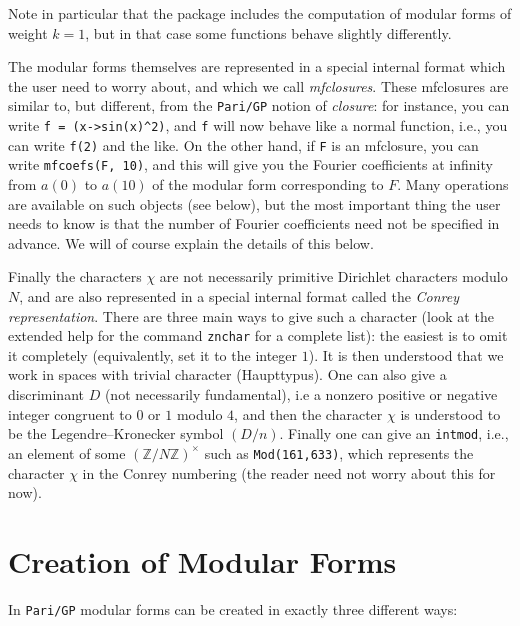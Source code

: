 \documentclass[11pt]{article}
\newcommand{\Z}{{\mathbb Z}}
\def\kbd#1{{\tt #1}}
\begin{document}
Note in particular that the package includes the computation of modular
forms of weight $k=1$, but in that case some functions behave slightly
differently.

\medskip

The modular forms themselves are represented in a special internal format
which the user need to worry about, and which we call \emph{mfclosures}.
These mfclosures are similar to, but different, from the \kbd{Pari/GP} notion
of \emph{closure}: for instance, you can write \kbd{f = (x->sin(x)\^{}2)},
and \kbd{f} will now behave like a normal function, i.e., you can write
\kbd{f(2)} and the like. On the other hand, if \kbd{F} is an mfclosure,
you can write \kbd{mfcoefs(F, 10)}, and this will give you the Fourier
coefficients at infinity from $a(0)$ to $a(10)$ of the modular form
corresponding to $F$. Many operations are available on such objects
(see below), but the most important thing the user needs to know is that
the number of Fourier coefficients need not be specified in advance. We will
of course explain the details of this below.

\medskip

Finally the characters $\chi$ are not necessarily primitive Dirichlet
characters modulo $N$, and are also represented in a special internal
format called the \emph{Conrey representation}. There are three main
ways to give such a character (look at the extended help for the
command \kbd{znchar} for a complete list): the easiest is to omit it completely
(equivalently, set it to the integer $1$). It is then understood that we work
in spaces with trivial character (Haupttypus). One can also give a
discriminant $D$ (not necessarily fundamental), i.e a nonzero positive
or negative integer congruent to $0$ or $1$ modulo $4$, and then the
character $\chi$ is understood to be the Legendre--Kronecker symbol $(D/n)$.
Finally one can give an \kbd{intmod}, i.e., an element of some $(\Z/N\Z)^\times$
such as \kbd{Mod(161,633)}, which represents the character $\chi$ in
the Conrey numbering (the reader need not worry about this for now).

\section{Creation of Modular Forms}

In \kbd{Pari/GP} modular forms can be created in exactly three different ways:
\end{document}
